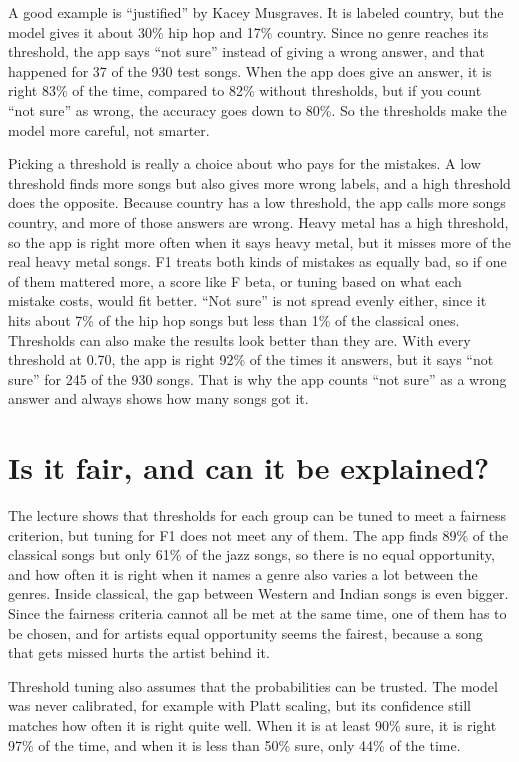 \documentclass[11pt,a4paper]{article}
\begin{document}
A good example is \enquote{justified} by Kacey Musgraves. It is labeled country, but the model gives it about 30\% hip hop and 17\% country. Since no genre reaches its threshold, the app says \enquote{not sure} instead of giving a wrong answer, and that happened for 37 of the 930 test songs. When the app does give an answer, it is right 83\% of the time, compared to 82\% without thresholds, but if you count \enquote{not sure} as wrong, the accuracy goes down to 80\%. So the thresholds make the model more careful, not smarter.

Picking a threshold is really a choice about who pays for the mistakes. A low threshold finds more songs but also gives more wrong labels, and a high threshold does the opposite. Because country has a low threshold, the app calls more songs country, and more of those answers are wrong. Heavy metal has a high threshold, so the app is right more often when it says heavy metal, but it misses more of the real heavy metal songs. F1 treats both kinds of mistakes as equally bad, so if one of them mattered more, a score like F beta, or tuning based on what each mistake costs, would fit better. \enquote{Not sure} is not spread evenly either, since it hits about 7\% of the hip hop songs but less than 1\% of the classical ones. Thresholds can also make the results look better than they are. With every threshold at 0.70, the app is right 92\% of the times it answers, but it says \enquote{not sure} for 245 of the 930 songs. That is why the app counts \enquote{not sure} as a wrong answer and always shows how many songs got it.

\section{Is it fair, and can it be explained?}

The lecture shows that thresholds for each group can be tuned to meet a fairness criterion, but tuning for F1 does not meet any of them. The app finds 89\% of the classical songs but only 61\% of the jazz songs, so there is no equal opportunity, and how often it is right when it names a genre also varies a lot between the genres. Inside classical, the gap between Western and Indian songs is even bigger. Since the fairness criteria cannot all be met at the same time, one of them has to be chosen, and for artists equal opportunity seems the fairest, because a song that gets missed hurts the artist behind it.

Threshold tuning also assumes that the probabilities can be trusted. The model was never calibrated, for example with Platt scaling, but its confidence still matches how often it is right quite well. When it is at least 90\% sure, it is right 97\% of the time, and when it is less than 50\% sure, only 44\% of the time.
\end{document}
